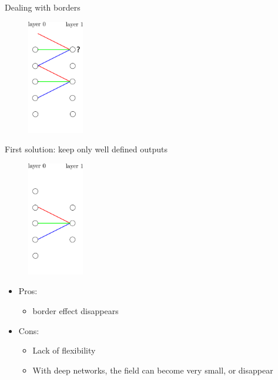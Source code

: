 \documentclass[xcolor=pdftex,dvipsnames,table,mathserif]{beamer}
\begin{document}
\begin{frame}{Dealing with borders}

  \begin{figure}
    \includegraphics[height=5cm]{conv_border_effect}
  \end{figure}

\end{frame}

\begin{frame}{First solution: keep only well defined outputs}

  \begin{figure}
    \includegraphics[height=5cm]{conv_border_effect2}
  \end{figure}

\begin{itemize}
\item Pros:
  \begin{itemize}
  \item border effect disappears
  \end{itemize}
\item Cons:
  \begin{itemize}
  \item Lack of flexibility
  \item With deep networks, the field can become very small, or disappear
  \end{itemize}
\end{itemize}

\end{frame}
\end{document}
